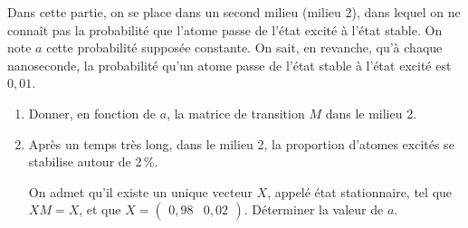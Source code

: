 \bigbreak
{}
\medbreak
Dans cette partie, on se place dans un second milieu (milieu 2), dans lequel on ne connaît pas la probabilité que l'atome passe de l'état excité à l'état stable. On note $a$ cette probabilité supposée constante. On sait, en revanche, qu'à chaque nanoseconde, la probabilité qu'un atome passe de l'état stable à l'état excité est $0,01$.
\medbreak
\begin{enumerate}
     \item Donner, en fonction de $a$, la matrice de transition $M$ dans le milieu 2.
     \item Après un temps très long, dans le milieu 2, la proportion d'atomes excités se stabilise autour de 2\,\%.
     \par
     On admet qu'il existe un unique vecteur $X$, appelé état stationnaire, tel que $XM = X$, et que $X = \begin{pmatrix}0,98& 0,02\end{pmatrix}$.
     Déterminer la valeur de $a$.
\end{enumerate}
